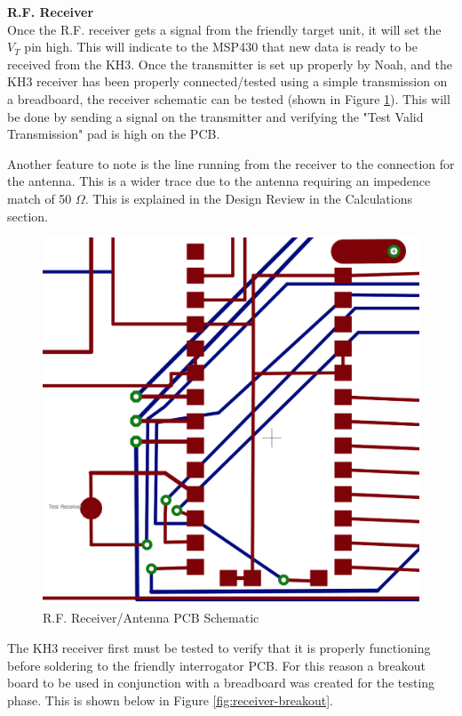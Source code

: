 \documentclass[letterpaper,10pt]{article}
\begin{document}
\begin{spacing}{1.15}
\normalsize\textbf{R.F. Receiver} \\
Once the R.F. receiver gets a signal from the friendly target unit, it will set the $V_{T}$ pin high. This will indicate to the MSP430 that new data is ready to be received from the KH3. Once the transmitter is set up properly by Noah, and the KH3 receiver has been properly connected/tested using a simple transmission on a breadboard, the receiver schematic can be tested (shown in Figure \ref{fig:receiver-pcb}). This will be done by sending a signal on the transmitter and verifying the "Test Valid Transmission" pad is high on the PCB. 

Another feature to note is the line running from the receiver to the connection for the antenna. This is a wider trace due to the antenna requiring an impedence match of 50 $\Omega$. This is explained in the Design Review in the Calculations section. 
\begin{figure} [H]
	\centering
	\includegraphics[scale=0.4]{receiver-antenna-pcb.png}
	\caption{R.F. Receiver/Antenna PCB Schematic\label{fig:receiver-pcb}}
\end{figure}


The KH3 receiver first must be tested to verify that it is properly functioning before soldering to the friendly interrogator PCB. For this reason a breakout board to be used in conjunction with a breadboard was created for the testing phase. This is shown below in Figure \ref{fig:receiver-breakout}.


\end{spacing}
\end{document}
